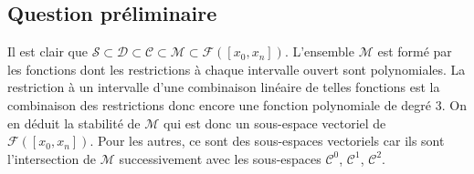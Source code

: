 \subsection*{Question préliminaire}
Il est clair que $\mathcal{S} \subset \mathcal{D} \subset \mathcal{C} \subset \mathcal{M} \subset \mathcal{F}([x_0,x_n])$.\newline
L'ensemble $\mathcal{M}$ est formé par les fonctions dont les restrictions à chaque intervalle ouvert sont polynomiales. La restriction à un intervalle d'une combinaison linéaire de telles fonctions est la combinaison des restrictions donc encore une fonction polynomiale de degré $3$. On en déduit la stabilité de $\mathcal{M}$ qui est donc un sous-espace vectoriel de $\mathcal{F}([x_0,x_n])$.\newline
Pour les autres, ce sont des sous-espaces vectoriels car ils sont l'intersection de $\mathcal{M}$ successivement avec les sous-espaces $\mathcal{C}^0$, $\mathcal{C}^1$, $\mathcal{C}^2$.

